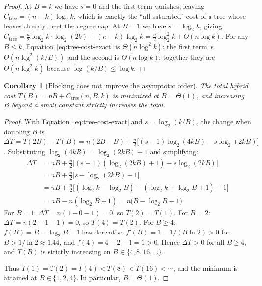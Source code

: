 \documentclass[11pt]{article}
\newtheorem{corollary}[theorem]{Corollary}
\begin{document}
\begin{proof}
At $B = k$ we have $s = 0$ and the first term vanishes, leaving
$C_{\text{tree}} = (n-k)\log_2 k$, which is exactly the ``all-saturated''
cost of a tree whose leaves already meet the degree cap. At $B = 1$
we have $s = \log_2 k$, giving
$C_{\text{tree}} = \frac{n}{2}\log_2 k \cdot \log_2(2k) + (n-k)\log_2 k
= \frac{n}{2}\log_2^2 k + O(n\log k)$.
For any $B \le k$, Equation~\ref{eq:tree-cost-exact} is
$\Theta(n\log^2 k)$: the first term is $\Theta(n\log^2(k/B))$ and the
second is $\Theta(n\log k)$; together they are $\Theta(n\log^2 k)$
because $\log(k/B) \le \log k$.
\end{proof}

\begin{corollary}[Blocking does not improve the asymptotic order]\label{cor:blocking-constant}
The total hybrid cost $T(B) = nB + C_{\text{tree}}(n,B,k)$ is minimized
at $B = \Theta(1)$, and increasing $B$ beyond a small constant strictly
increases the total.
\end{corollary}
\begin{proof}
With Equation~\ref{eq:tree-cost-exact} and $s = \log_2(k/B)$,
the change when doubling $B$ is
$\Delta T = T(2B) - T(B) = n(2B - B) + \frac{n}{2}\bigl[(s-1)\log_2(4kB)
- s\log_2(2kB)\bigr]$.  Substituting $\log_2(4kB) = \log_2(2kB) + 1$ and
simplifying:
\begin{align*}
  \Delta T &= nB + \frac{n}{2}\bigl[(s-1)(\log_2(2kB) + 1)
              - s\log_2(2kB)\bigr] \\
           &= nB + \frac{n}{2}\bigl[s - \log_2(2kB) - 1\bigr] \\
           &= nB + \frac{n}{2}\bigl[(\log_2 k - \log_2 B)
              - (\log_2 k + \log_2 B + 1) - 1\bigr] \\
           &= nB - n(\log_2 B + 1)
            = n\bigl(B - \log_2 B - 1\bigr).
\end{align*}
For $B = 1$: $\Delta T = n(1 - 0 - 1) = 0$, so $T(2) = T(1)$.
For $B = 2$: $\Delta T = n(2 - 1 - 1) = 0$, so $T(4) = T(2)$.
For $B \ge 4$: $f(B) = B - \log_2 B - 1$ has derivative
$f'(B) = 1 - 1/(B\ln 2) > 0$ for $B > 1/\ln 2 \approx 1.44$, and
$f(4) = 4 - 2 - 1 = 1 > 0$.  Hence $\Delta T > 0$ for all $B \ge 4$,
and $T(B)$ is strictly increasing on $B \in \{4,8,16,\ldots\}$.

Thus $T(1) = T(2) = T(4) < T(8) < T(16) < \cdots$, and the minimum is
attained at $B \in \{1,2,4\}$.  In particular, $B = \Theta(1)$.
\end{proof}
\end{document}
